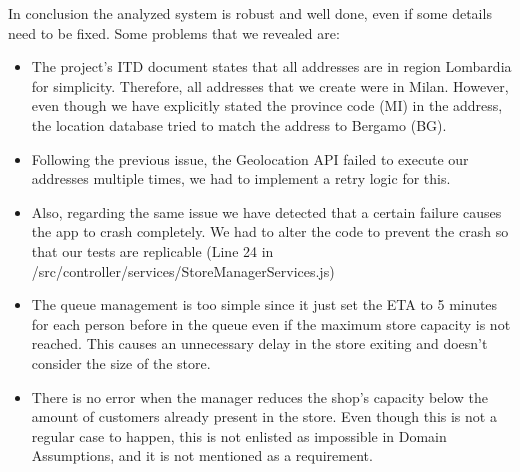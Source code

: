 In conclusion the analyzed system is robust and well done, even if some details need to be fixed.
Some problems that we revealed are: \\
\begin{itemize}
    \item The project's ITD document states that all addresses are in region Lombardia for simplicity.
    Therefore, all addresses that we create were in Milan.
    However, even though we have explicitly stated the province code (MI) in the address, the location database tried to match the address to Bergamo (BG).
    \item Following the previous issue, the Geolocation API failed to execute our addresses multiple times, we had to implement a retry logic for this.
    \item Also, regarding the same issue we have detected that a certain failure causes the app to crash completely.
    We had to alter the code to prevent the crash so that our tests are replicable (Line 24 in /src/controller/services/StoreManagerServices.js)
    \item The queue management is too simple since it just set the ETA to 5 minutes for each person before in the queue even if the maximum store capacity is not reached.
    This causes an unnecessary delay in the store exiting and doesn't consider the size of the store.
    \item There is no error when the manager reduces the shop's capacity below the amount of customers already present in the store.
    Even though this is not a regular case to happen, this is not enlisted as impossible in Domain Assumptions, and it is not mentioned as a requirement.
\end{itemize}
